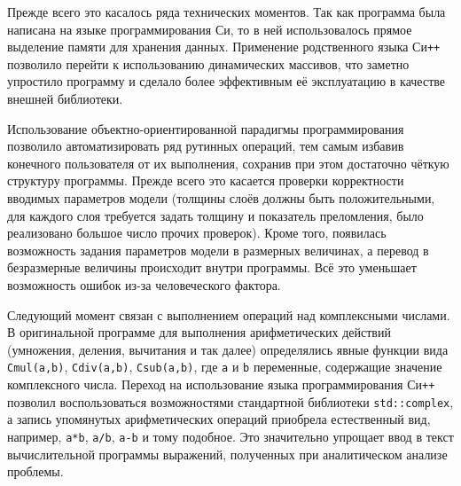 Прежде всего это касалось ряда технических моментов. Так как программа
была написана на языке программирования Си, то в ней использовалось
прямое выделение памяти для хранения данных.  Применение
родственного языка Си\texttt{++} позволило перейти к использованию
динамических массивов, что заметно упростило
программу и сделало более эффективным её эксплуатацию в качестве
внешней библиотеки.

Использование объектно-ориентированной парадигмы программирования
позволило автоматизировать ряд рутинных операций, тем самым избавив
конечного пользователя от их выполнения, сохранив при этом достаточно
чёткую структуру программы.  Прежде всего это касается проверки
корректности вводимых параметров модели (толщины слоёв должны быть
положительными, для каждого слоя требуется задать толщину и показатель
преломления, было реализовано большое число прочих проверок). Кроме
того, появилась возможность задания параметров модели в размерных
величинах, а перевод в безразмерные величины происходит внутри
программы. Всё это уменьшает возможность ошибок из-за человеческого
фактора.

Следующий момент связан с выполнением операций над комплексными
числами.  В оригинальной программе для выполнения арифметических
действий (умножения, деления, вычитания и так далее) определялись
явные функции вида \verb+Cmul(a,b)+, \verb+Cdiv(a,b)+,
\verb+Csub(a,b)+, где \verb+a+ и \verb+b+ переменные, содержащие
значение комплексного числа.  Переход на использование языка
программирования Си\texttt{++} позволил воспользоваться возможностями
стандартной библиотеки \verb+std::complex+, а запись упомянутых
арифметических операций приобрела естественный вид, например,
\verb!a*b!, \verb!a/b!, \verb!a-b! и тому подобное.  Это значительно
упрощает ввод в текст вычислительной программы выражений, полученных
при аналитическом анализе проблемы.

